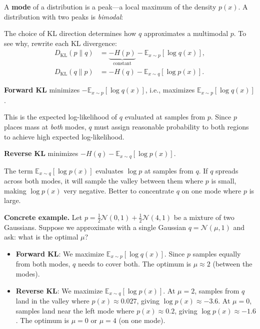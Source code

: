 \begin{remark}
    A \textbf{mode} of a distribution is a peak---a local maximum of the density $p(x)$. A distribution with two peaks is \emph{bimodal}:
    \begin{center}
    \end{center}

    The choice of KL direction determines how $q$ approximates a multimodal $p$. To see why, rewrite each KL divergence:
    \begin{align*}
        D_{\mathrm{KL}}(p \| q) & = \underbrace{-H(p)}_{\text{constant}} - \mathbb{E}_{x \sim p}[\log q(x)], \\
        D_{\mathrm{KL}}(q \| p) & = -H(q) - \mathbb{E}_{x \sim q}[\log p(x)].
    \end{align*}

    \textbf{Forward KL} minimizes $-\mathbb{E}_{x \sim p}[\log q(x)]$, i.e., maximizes $\mathbb{E}_{x \sim p}[\log q(x)]$.

    This is the expected log-likelihood of $q$ evaluated at samples from $p$. Since $p$ places mass at \emph{both} modes, $q$ must assign reasonable probability to both regions to achieve high expected log-likelihood.

    \textbf{Reverse KL} minimizes $-H(q) - \mathbb{E}_{x \sim q}[\log p(x)]$.

    The term $\mathbb{E}_{x \sim q}[\log p(x)]$ evaluates $\log p$ at samples from $q$. If $q$ spreads across both modes, it will sample the valley between them where $p$ is small, making $\log p(x)$ very negative. Better to concentrate $q$ on one mode where $p$ is large.

    \textbf{Concrete example.} Let $p = \frac{1}{2}\mathcal{N}(0, 1) + \frac{1}{2}\mathcal{N}(4, 1)$ be a mixture of two Gaussians. Suppose we approximate with a single Gaussian $q = \mathcal{N}(\mu, 1)$ and ask: what is the optimal $\mu$?
    \begin{itemize}
        \item \textbf{Forward KL}: We maximize $\mathbb{E}_{x \sim p}[\log q(x)]$. Since $p$ samples equally from both modes, $q$ needs to cover both. The optimum is $\mu \approx 2$ (between the modes).
        \item \textbf{Reverse KL}: We maximize $\mathbb{E}_{x \sim q}[\log p(x)]$. At $\mu = 2$, samples from $q$ land in the valley where $p(x) \approx 0.027$, giving $\log p(x) \approx -3.6$. At $\mu = 0$, samples land near the left mode where $p(x) \approx 0.2$, giving $\log p(x) \approx -1.6$. The optimum is $\mu = 0$ or $\mu = 4$ (on one mode).
    \end{itemize}


\end{remark}
